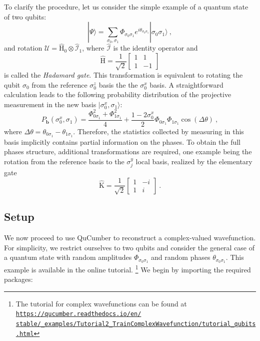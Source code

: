 \documentclass[submission, Phys, hidelnks]{SciPost}
\begin{document}
To clarify the procedure, let us consider the simple example of a quantum state
of two qubits:
\begin{equation}
    |\Psi\rangle=\sum_{\sigma_0,\sigma_1}\Phi_{\sigma_0\sigma_1}e^{i\theta_{\sigma_0\sigma_1}}|\sigma_0\sigma_1\rangle\:,
\end{equation}
and rotation $\bm{\mathcal{U}}=\hat{\mathrm{H}}_0\otimes\hat{\mathcal{I}}_1$,
where $\hat{\mathcal{I}}$ is the identity operator and
\begin{equation}
    \hat{\mathrm{H}}=\frac{1}{\sqrt{2}}\begin{bmatrix}1 & 1\\
1 & -1
\end{bmatrix}
\end{equation}
is called the {\it Hadamard gate}. This transformation is equivalent to
rotating the qubit $\sigma_0$ from the reference $\sigma_0^z$ basis the the
$\sigma_0^x$ basis. A straightforward calculation leads to the following
probability distribution of the projective measurement in the new basis
$|\sigma_0^x,\sigma_1\rangle$:
\begin{equation}
    P_{\bm{b}}(\sigma_0^x,\sigma_1)=\frac{\Phi_{0\sigma_1}^2+\Phi_{1\sigma_1}^2}{4}+\frac{1-2\sigma_0^x}{2}\Phi_{0\sigma_1}\Phi_{1\sigma_1}\cos(\Delta\theta)\:,
\end{equation}
where $\Delta\theta=\theta_{0\sigma_1}-\theta_{1\sigma_1}$. Therefore, the
statistics collected by measuring in this basis implicitly contains partial
information on the phases. To obtain the full phases structure, additional
transformations are required, one example being the rotation from the reference
basis to the $\sigma^y_j$ local basis, realized by
the elementary gate
\begin{equation}
        \hat{\mathrm{K}}=\frac{1}{\sqrt{2}}\begin{bmatrix}1 & -i\\
    1 & i
\end{bmatrix}\:.
\end{equation}


\subsection{Setup}
We now proceed to use QuCumber to reconstruct a complex-valued wavefunction.
For simplicity, we restrict ourselves to two qubits and consider the general case
of a quantum state with random amplitudes $\Phi_{\sigma_0\sigma_1}$ and random
phases $\theta_{\sigma_0\sigma_1}$. This example is available in the online tutorial.
\footnote{The tutorial for complex wavefunctions can be found at
    \href{https://qucumber.readthedocs.io/en/stable/\_examples/Tutorial2_TrainComplexWavefunction/tutorial_qubits.html
    }{\texttt{https://qucumber.readthedocs.io/en/\\stable/\_examples/Tutorial2\_TrainComplexWavefunction/tutorial\_qubits.html}}
}
We begin by importing the required packages:
\end{document}

